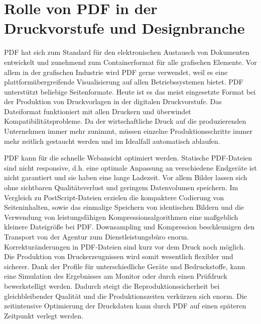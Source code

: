 \section{Rolle von PDF in der Druckvorstufe und Designbranche}
PDF hat sich zum Standard für den elektronischen Austausch von Dokumenten entwickelt und zunehmend zum Containerformat für alle grafischen Elemente. Vor allem in der grafischen Industrie wird PDF gerne verwendet, weil es eine plattformübergreifende Visualisierung auf allen Betriebssystemen bietet. PDF unterstützt beliebige Seitenformate. Heute ist es das meist eingesetzte Format bei der Produktion von Druckvorlagen in der digitalen Druckvorstufe. Das Dateiformat funktioniert mit allen Druckern und überwindet Kompatibilitätsprobleme. Da der wirtschaftliche Druck auf die produzierenden Unternehmen immer mehr zunimmt, müssen einzelne Produktionsschritte immer mehr zeitlich gestaucht werden und im Idealfall automatisch ablaufen. 
\par
PDF kann für die schnelle Webansicht optimiert werden. Statische PDF-Dateien sind nicht responsive, d.h. eine optimale Anpassung an verschiedene Endgeräte ist nicht garantiert und sie haben eine lange Ladezeit. Vor allem Bilder lassen sich ohne sichtbaren Qualitätsverlust und geringem Datenvolumen speichern. Im Vergleich zu PostScript-Dateien erzielen die kompaktere Codierung von Seiteninhalten, sowie das einmalige Speichern von identischen Bildern und die Verwendung von leistungsfähigen Kompressionsalgorithmen eine maßgeblich kleinere Dateigröße bei PDF. Downsampling und Kompression beschleunigen den Transport von der Agentur zum Dienstleistungsbüro enorm. Korrekturänderungen in PDF-Dateien sind kurz vor dem Druck noch möglich. Die Produktion von Druckerzeugnissen wird somit wesentlich flexibler und sicherer. Dank der Profile für unterschiedliche Geräte und Bedruckstoffe, kann eine Simulation des Ergebnisses am Monitor oder durch einen Prüfdruck bewerkstelligt werden. Dadurch steigt die Reproduktionssicherheit bei gleichbleibender Qualität und die Produktionszeiten verkürzen sich enorm. Die zeitintensive Optimierung der Druckdaten kann durch PDF auf einen späteren Zeitpunkt verlegt werden. 
\par
